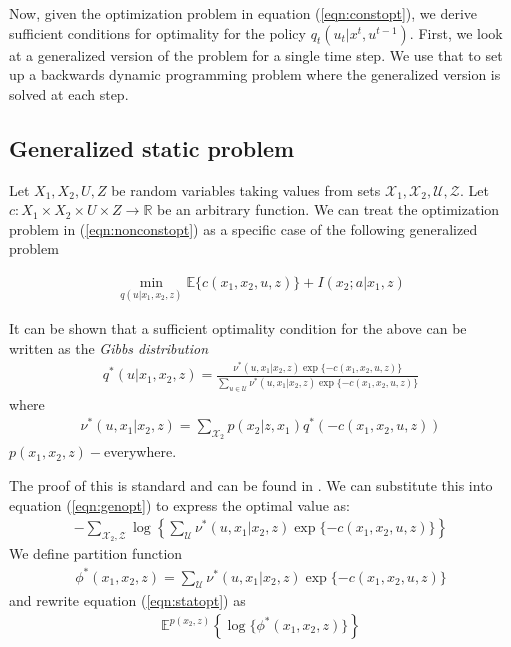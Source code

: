 Now, given the optimization problem in equation (\ref{eqn:constopt}), we derive sufficient conditions for optimality for the policy $q_t(u_t|x^t,u^{t-1})$. First, we look at a generalized version of the problem for a single time step. We use that to set up a backwards dynamic programming problem where the generalized version is solved at each step.

\subsection{Generalized static problem}
Let $X_1,X_2,U,Z$ be random variables taking values from sets $\mathcal{X}_1,\mathcal{X}_2,\mathcal{U},\mathcal{Z}$. Let $c : X_1 \times X_2 \times U \times Z \rightarrow \mathbb{R}$ be an arbitrary function. We can treat the optimization problem in (\ref{eqn:nonconstopt}) as a specific case of the following generalized problem

\begin{align}\label{eqn:genopt}
\min_{q(u|x_1,x_2,z)} \mathbb{E}\{c\left(x_1,x_2,u,z \right)\} + I(x_2;a|x_1,z)
\end{align}

\begin{lemma}
It can be shown that a sufficient optimality condition for the above can be written as the \textit{Gibbs distribution}
\begin{align}
q^{*}(u|x_1,x_2,z) = \frac{\nu^{*}(u,x_1|x_2,z)\exp\{-c(x_1,x_2,u,z)\}}{\sum_{u\in \mathcal{U}}\nu^{*}(u,x_1|x_2,z)\exp\{-c(x_1,x_2,u,z)\}}
\end{align}
where 
\begin{align}
\nu^{*}(u,x_1|x_2,z) = \sum_{\mathcal{X}_2}p(x_2|z,x_1)q^*\left(-c(x_1,x_2,u,z)\right)
\end{align}
$p(x_1,x_2,z)-$everywhere.
\end{lemma}

The proof of this is standard and can be found in \cite{petersen2012robust}. We can substitute this into equation (\ref{eqn:genopt}) to express the optimal value as:
\begin{align}\label{eqn:statopt}
-\sum_{\mathcal{X}_2,\mathcal{Z}}\log\left\lbrace\sum_{\mathcal{U}} \nu^{*}(u,x_1|x_2,z)\exp\{ -c(x_1,x_2,u,z)\} \right\rbrace
\end{align}
We define partition function
\begin{align}
\phi^{*}(x_1,x_2,z) =  \sum_{\mathcal{U}} \nu^{*}(u,x_1|x_2,z)\exp\{ -c(x_1,x_2,u,z)\} 
\end{align}
and rewrite equation (\ref{eqn:statopt}) as 
\begin{align}
\mathbb{E}^{p(x_2,z)}\left\lbrace\log\{\phi^{*}(x_1,x_2,z) \}\right\rbrace
\end{align}

